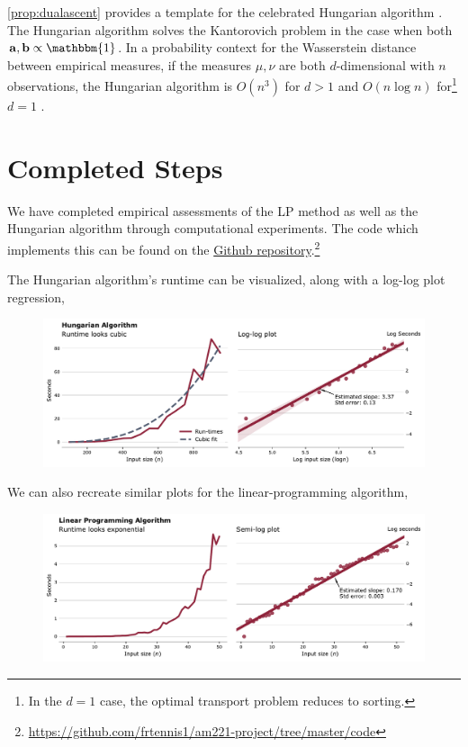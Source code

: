 \documentclass[11pt,reqno]{amsart}
\renewcommand{\b}{\mathbf}
\newcommand{\one}{\mathbbm{1}}
\theoremstyle{definition}
\theoremstyle{remark}
\begin{document}
\cref{prop:dualascent} provides a template for the celebrated Hungarian
algorithm \cite{kuhn2010hungarian}. The Hungarian algorithm solves the
Kantorovich problem in the case when both $\b a, \b b \propto \one$. In a
probability context for the Wasserstein distance between empirical measures, if
the measures $\mu, \nu$ are both $d$-dimensional with $n$ observations, the
Hungarian algorithm is $O(n^3)$ for $d>1$ and $O(n\log n)$ for\footnote{In the
$d=1$ case, the optimal transport problem reduces to sorting.} $d = 1$
\cite{bernton2017inference}.

\section{Completed Steps}

We have completed empirical assessments of the LP method as well as the
Hungarian algorithm through computational experiments. The code which implements
this can be found on the
\href{https://github.com/frtennis1/am221-project/tree/master/code}{Github
repository}.\footnote{\url{https://github.com/frtennis1/am221-project/tree/master/code}}

The Hungarian algorithm's runtime can be visualized, along with a log-log plot
regression,

\begin{figure}[h]
\includegraphics[width=\textwidth]{../../code/hungarianruntime}
\label{fig:hungarianruntime}
\end{figure}


We can also recreate similar plots for the linear-programming algorithm,

\begin{figure}[h]
\includegraphics[width=\textwidth]{../../code/lpruntime}
\end{figure}
\end{document}
